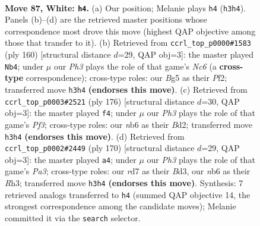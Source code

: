 \documentclass[11pt]{article}
\begin{document}
\clearpage

\begin{figure}[p]\centering
\begin{subfigure}{0.46\textwidth}\centering
\resizebox{\linewidth}{!}{%
\newchessgame
\chessboard[
  setfen={6k1/3r4/1n6/2R3B1/p4P2/P6P/7K/8 w - - 29 87},
  showmover=false,
  pgfstyle=straightmove, color=movearrow, markmove={h3-h4}
]}
\caption{}
\end{subfigure}\hfill
\begin{subfigure}{0.46\textwidth}\centering
\resizebox{\linewidth}{!}{%
\newchessgame
\chessboard[
  setfen={8/6k1/2N2n2/3r2pp/8/6P1/4RPK1/8 w - - 10 81},
  showmover=false,
  pgfstyle=straightmove, color=movearrow, markmove={c6-b4}
]}
\caption{}
\end{subfigure}
\\[4pt]
\begin{subfigure}{0.46\textwidth}\centering
\resizebox{\linewidth}{!}{%
\newchessgame
\chessboard[
  setfen={8/5k2/p7/P1r5/b3K3/5P2/3BR3/8 w - - 14 89},
  showmover=false,
  pgfstyle=straightmove, color=movearrow, markmove={f3-f4}
]}
\caption{}
\end{subfigure}\hfill
\begin{subfigure}{0.46\textwidth}\centering
\resizebox{\linewidth}{!}{%
\newchessgame
\chessboard[
  setfen={8/8/8/3k4/1P1n4/P2B3R/1K6/6r1 w - - 7 86},
  showmover=false,
  pgfstyle=straightmove, color=movearrow, markmove={a3-a4}
]}
\caption{}
\end{subfigure}
\caption{\textbf{Move 87, White: \texttt{h4}.} (a) Our position; Melanie plays \texttt{h4} (\texttt{h3h4}). Panels (b)--(d) are the retrieved master positions whose correspondence most drove this move (highest QAP objective among those that transfer to it). (b) Retrieved from \texttt{ccrl\_top\_p0000\#1583} (ply 160) [structural distance $d$=29, QAP obj=3]: the master played \texttt{Nb4}; under $\mu$ our \emph{Ph3} plays the role of that game's \emph{Nc6} (a \textbf{cross-type} correspondence); cross-type roles: our \emph{B}g5 as their \emph{P}f2; transferred move \texttt{h3h4} \textbf{(endorses this move)}. (c) Retrieved from \texttt{ccrl\_top\_p0003\#2521} (ply 176) [structural distance $d$=30, QAP obj=3]: the master played \texttt{f4}; under $\mu$ our \emph{Ph3} plays the role of that game's \emph{Pf3}; cross-type roles: our \emph{n}b6 as their \emph{B}d2; transferred move \texttt{h3h4} \textbf{(endorses this move)}. (d) Retrieved from \texttt{ccrl\_top\_p0002\#2449} (ply 170) [structural distance $d$=29, QAP obj=3]: the master played \texttt{a4}; under $\mu$ our \emph{Ph3} plays the role of that game's \emph{Pa3}; cross-type roles: our \emph{r}d7 as their \emph{B}d3, our \emph{n}b6 as their \emph{R}h3; transferred move \texttt{h3h4} \textbf{(endorses this move)}. Synthesis: 7 retrieved analogs transferred to \texttt{h4} (summed QAP objective 14, the strongest correspondence among the candidate moves); Melanie committed it via the \texttt{search} selector.}
\label{fig:thought-m172}
\end{figure}
\end{document}
